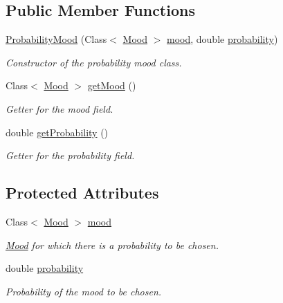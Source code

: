\subsection*{Public Member Functions}
\begin{DoxyCompactItemize}
\item 
\hyperlink{classgameplay_1_1ai_1_1mood_1_1_probability_mood_a0cd3142b0fb1df769e3475058e0b968d}{Probability\-Mood} (Class$<$ \hyperlink{classgameplay_1_1ai_1_1mood_1_1_mood}{Mood} $>$ \hyperlink{classgameplay_1_1ai_1_1mood_1_1_probability_mood_afe864a647d2e9d766688d5e7549feec4}{mood}, double \hyperlink{classgameplay_1_1ai_1_1mood_1_1_probability_mood_a44377e9c9418a71f5151439c58f7b555}{probability})
\begin{DoxyCompactList}\small\item\em Constructor of the probability mood class. \end{DoxyCompactList}\item 
Class$<$ \hyperlink{classgameplay_1_1ai_1_1mood_1_1_mood}{Mood} $>$ \hyperlink{classgameplay_1_1ai_1_1mood_1_1_probability_mood_ae36103079d0cd5fee9a69bf427a8e3b0}{get\-Mood} ()
\begin{DoxyCompactList}\small\item\em Getter for the mood field. \end{DoxyCompactList}\item 
double \hyperlink{classgameplay_1_1ai_1_1mood_1_1_probability_mood_a5744b122182f8a9a79d759764ed2d3e1}{get\-Probability} ()
\begin{DoxyCompactList}\small\item\em Getter for the probability field. \end{DoxyCompactList}\end{DoxyCompactItemize}
\subsection*{Protected Attributes}
\begin{DoxyCompactItemize}
\item 
Class$<$ \hyperlink{classgameplay_1_1ai_1_1mood_1_1_mood}{Mood} $>$ \hyperlink{classgameplay_1_1ai_1_1mood_1_1_probability_mood_afe864a647d2e9d766688d5e7549feec4}{mood}
\begin{DoxyCompactList}\small\item\em \hyperlink{classgameplay_1_1ai_1_1mood_1_1_mood}{Mood} for which there is a probability to be chosen. \end{DoxyCompactList}\item 
double \hyperlink{classgameplay_1_1ai_1_1mood_1_1_probability_mood_a44377e9c9418a71f5151439c58f7b555}{probability}
\begin{DoxyCompactList}\small\item\em Probability of the mood to be chosen. \end{DoxyCompactList}\end{DoxyCompactItemize}


